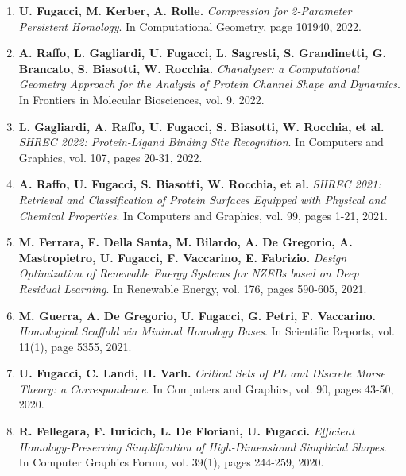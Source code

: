 \documentclass[11pt]{article}
\begin{document}
\begin{enumerate}

\item{\bf U. Fugacci, M. Kerber, A. Rolle.} {\em Compression for 2-Parameter Persistent Homology}. In Computational Geometry, page 101940, 2022.

\item{\bf A. Raffo, L. Gagliardi, U. Fugacci, L. Sagresti, S. Grandinetti, G. Brancato, S. Biasotti, W. Rocchia.} {\em Chanalyzer: a Computational Geometry Approach for the Analysis of Protein Channel Shape and Dynamics}. In Frontiers in Molecular Biosciences, vol. 9, 2022.

\item{\bf L. Gagliardi, A. Raffo, U. Fugacci, S. Biasotti, W. Rocchia,
et al.
} {\em SHREC 2022: Protein-Ligand Binding Site Recognition}. In Computers and Graphics, vol. 107, pages 20-31, 2022.

\item {\bf A. Raffo, U. Fugacci, S. Biasotti, W. Rocchia,
et al.
} {\em SHREC 2021: Retrieval and Classification of Protein Surfaces Equipped with Physical and Chemical Properties}. In Computers and Graphics, vol. 99, pages 1-21, 2021.

\item {\bf M. Ferrara, F. Della Santa, M. Bilardo, A. De Gregorio, A. Mastropietro, U. Fugacci, F. Vaccarino, E. Fabrizio.} {\em Design Optimization of Renewable Energy Systems for NZEBs based on Deep Residual Learning}. In Renewable Energy, vol. 176, pages 590-605, 2021.

\item {\bf M. Guerra, A. De Gregorio, U. Fugacci, G. Petri, F. Vaccarino.} {\em Homological Scaffold via Minimal Homology Bases}. In Scientific Reports, vol. 11(1), page 5355, 2021.

\item {\bf U. Fugacci, C. Landi, H. Varl{\i}.} {\em Critical Sets of PL and Discrete Morse Theory: a Correspondence}. In Computers and Graphics, vol. 90, pages 43-50, 2020.

\item {\bf R. Fellegara, F. Iuricich, L. De Floriani, U. Fugacci.} {\em Efficient Homology-Preserving Simplification of High-Dimensional Simplicial Shapes}. In Computer Graphics Forum, vol. 39(1), pages 244-259, 2020.


\end{enumerate}
\end{document}
